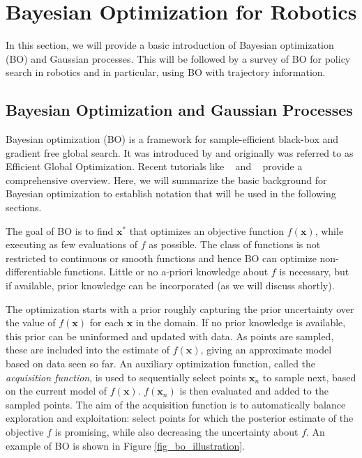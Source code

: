 \section{Bayesian Optimization for Robotics}

In this section, we will provide a basic introduction of Bayesian optimization (BO) and Gaussian processes. This will be followed by a survey of BO for policy search in robotics and in particular, using BO with trajectory information.

\subsection{Bayesian Optimization and Gaussian Processes}
Bayesian optimization (BO) is a framework for sample-efficient black-box and gradient free global search. It was introduced by \cite{jones1998} and originally was referred to as Efficient Global Optimization. 
Recent tutorials like  ~\cite{BOtutorial2016} and ~\cite{BOtutorial2010} provide a  comprehensive overview. Here, we will summarize the basic background for Bayesian optimization to establish notation that will be used in the following sections.

The goal of BO is to find $\pmb{x}^*$ that optimizes an objective function $f(\pmb{x})$, while executing as few evaluations of $f$ as possible. 
The class of functions is not restricted to continuous or smooth functions and hence BO can optimize non-differentiable functions. Little or no a-priori knowledge about $f$ is necessary, but if available, prior knowledge can be incorporated (as we will discuss shortly).

The optimization starts with a prior roughly capturing the prior uncertainty over the value of $f(\pmb{x})$ for each $\pmb{x}$ in the domain. If no prior knowledge is available, this prior can be uninformed and updated with data. As points are sampled, these are included into the estimate of $f(\pmb{x})$, giving an approximate model based on data seen so far. An auxiliary optimization function, called the \textit{acquisition function}, is used to sequentially select points  $\pmb{x}_n$ to sample next, based on the current model of $f(\pmb{x})$. $f(\pmb{x}_n)$ is then evaluated and added to the sampled points. The aim of the acquisition function is to automatically balance exploration and exploitation: select points for which the posterior estimate of the objective $f$ is promising, while also decreasing the uncertainty about $f$. An example of BO is shown in Figure \ref{fig_bo_illustration}. 

